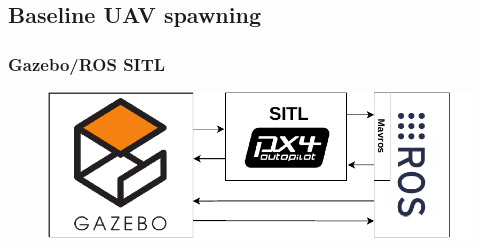\documentclass[aspectratio=169]{beamer}
\begin{document}


\subsection{Baseline UAV spawning}

\begin{frame}
  \frametitle{Gazebo/ROS SITL}

  \begin{figure}
    \centering
    \includegraphics[width=1.0\textwidth]{./fig/schematics/sitl.pdf}
  \end{figure}

\end{frame}


\end{document}
